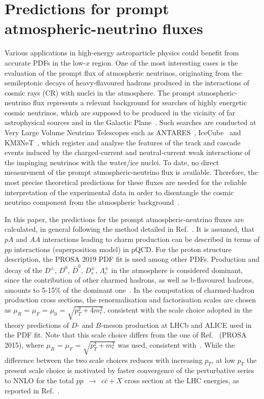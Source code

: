 \documentclass[12pt]{article}
\begin{document}
\section{Predictions for prompt atmospheric-neutrino fluxes}
\label{sec:astro}
Various applications in high-energy astroparticle physics could benefit from accurate PDFs in the low-$x$ region. One of the most interesting cases is the evaluation of the prompt flux of atmospheric neutrinos,
originating from the semileptonic decays of heavy-flavoured hadrons produced in the interactions of cosmic rays (CR) with nuclei in the atmosphere. The prompt atmospheric-neutrino flux represents a relevant background for searches of highly energetic cosmic neutrinos, which are supposed to be produced in the vicinity of far astrophysical sources and in the Galactic Plane~\cite{Gaisser:2016uoy}.  
Such searches are conducted at Very Large Volume Neutrino Telescopes such as ANTARES~\cite{Collaboration:2011nsa}, IceCube~\cite{Gaisser:2014foa} and KM3NeT~\cite{Adrian-Martinez:2016fdl}, which register and analyse the features of the track and cascade events induced by the charged-current and neutral-current weak interactions of the impinging neutrinos with the water/ice nuclei. To date, no direct measurement of the prompt atmospheric-neutrino flux is available. Therefore, the most precise theoretical predictions for these fluxes are needed for the reliable interpretation of the experimental data in order to disentangle the cosmic neutrino component from the atmospheric background~\cite{Mascaretti:2019uqn}.

In this paper, the predictions for the prompt atmospheric-neutrino fluxes are calculated, in general following the method detailed in Ref.~\cite{Garzelli:2016xmx}. It is assumed, that $pA$ and $AA$ interactions leading to charm production can be described in terms of $pp$ interactions (superposition model) in pQCD. For the proton structure description, the PROSA 2019 PDF fit is used among other PDFs.
Production and decay of the $D^\pm$, $D^0$, $\bar{D}^0$, $D_s^\pm$, $\Lambda_c^\pm$ in the atmosphere is considered dominant, 
since the contribution of other charmed hadrons, as well as b-flavoured hadrons, amounts to 5-15\% of the dominant one~\cite{Bhattacharya:2016jce}. In the computation of charmed-hadron production cross sections, the renormalisation and factorisation scales are chosen as $\mu_R$ = $\mu_F$ = $\mu_0$ = $\sqrt{p_T^2 + 4 m_c^2}$, consistent with the scale choice adopted in the theory predictions of $D$- and $B$-meson production at LHCb and ALICE used in the PDF fit. Note that this scale choice differs from the one of Ref.~\cite{Garzelli:2016xmx} (PROSA 2015), where $\mu_R$ = $\mu_F$ = $\sqrt{p_T^2 + m_c^2}$ was used, consistent with~\cite{Zenaiev:2015rfa}. While the difference between the two scale choices reduces with increasing $p_T$, at low $p_T$ the present scale choice is motivated by faster convergence of the perturbative series to NNLO for the total $pp$~$\rightarrow$~$c\bar{c} + X$ cross section at the LHC energies, as reported in Ref.~\cite{Garzelli:2015psa}. 
\end{document}
